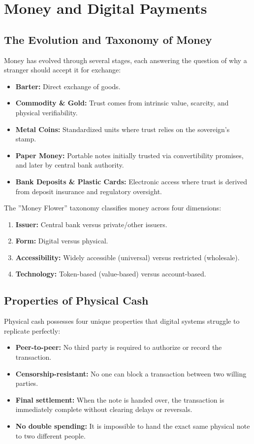 \section{Money and Digital Payments}

\subsection{The Evolution and Taxonomy of Money}
Money has evolved through several stages, each answering the question of why a
stranger should accept it for exchange:
\begin{itemize}
    \item \textbf{Barter:} Direct exchange of goods.
    \item \textbf{Commodity \& Gold:} Trust comes from intrinsic value, scarcity, and physical
          verifiability.
    \item \textbf{Metal Coins:} Standardized units where trust relies on the sovereign's stamp.
    \item \textbf{Paper Money:} Portable notes initially trusted via convertibility promises, and
          later by central bank authority.
    \item \textbf{Bank Deposits \& Plastic Cards:} Electronic access where trust is derived from
          deposit insurance and regulatory oversight.
\end{itemize}

The ''Money Flower'' taxonomy classifies money across four dimensions:
\begin{enumerate}
    \item \textbf{Issuer:} Central bank versus private/other issuers.
    \item \textbf{Form:} Digital versus physical.
    \item \textbf{Accessibility:} Widely accessible (universal) versus restricted (wholesale).
    \item \textbf{Technology:} Token-based (value-based) versus account-based.
\end{enumerate}

\subsection{Properties of Physical Cash}
Physical cash possesses four unique properties that digital systems struggle to
replicate perfectly:
\begin{itemize}
    \item \textbf{Peer-to-peer:} No third party is required to authorize or record the
          transaction.
    \item \textbf{Censorship-resistant:} No one can block a transaction between two willing
          parties.
    \item \textbf{Final settlement:} When the note is handed over, the transaction is immediately
          complete without clearing delays or reversals.
    \item \textbf{No double spending:} It is impossible to hand the exact same physical note to
          two different people.
\end{itemize}

